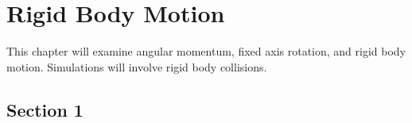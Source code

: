 
\chapter{Rigid Body Motion} %

\label{Chapter3} %



This chapter will examine angular momentum, fixed axis rotation, and rigid body motion.  Simulations will involve rigid body collisions.  


\section{Section 1}